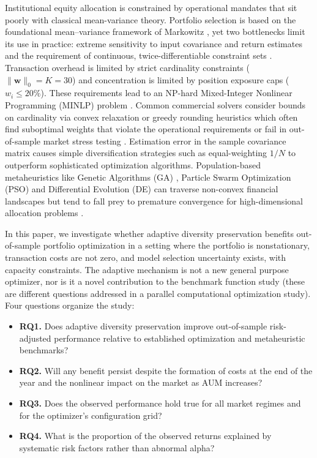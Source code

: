 \documentclass[11pt,a4paper]{article}
\begin{document}
Institutional equity allocation is constrained by operational mandates that sit poorly with classical mean-variance theory. Portfolio selection is based on the foundational mean--variance framework of Markowitz \cite{markowitz1952}, yet two bottlenecks limit its use in practice: extreme sensitivity to input covariance and return estimates \cite{olmo2023} and the requirement of continuous, twice-differentiable constraint sets \cite{li2024cardinality}. Transaction overhead is limited by strict cardinality constraints ($\|\mathbf{w}\|_0 = K = 30$) and concentration is limited by position exposure caps ($w_i \le 20\%$). These requirements lead to an NP-hard Mixed-Integer Nonlinear Programming (MINLP) problem \cite{li2024cardinality}. Common commercial solvers consider bounds on cardinality via convex relaxation or greedy rounding heuristics which often find suboptimal weights that violate the operational requirements or fail in out-of-sample market stress testing \cite{bertsimas1999, fabozzi2007}. Estimation error in the sample covariance matrix \cite{demiguel2009} causes simple diversification strategies such as equal-weighting $1/N$ to outperform sophisticated optimization algorithms. Population-based metaheuristics like Genetic Algorithms (GA) \cite{holland1992}, Particle Swarm Optimization (PSO) \cite{kennedy1995} and Differential Evolution (DE) \cite{storn1997} can traverse non-convex financial landscapes \cite{zheng2023} but tend to fall prey to premature convergence for high-dimensional allocation problems \cite{bailey2024}.

In this paper, we investigate whether adaptive diversity preservation benefits out-of-sample portfolio optimization in a setting where the portfolio is nonstationary, transaction costs are not zero, and model selection uncertainty exists, with capacity constraints. The adaptive mechanism is not a new general purpose optimizer, nor is it a novel contribution to the benchmark function study (these are different questions addressed in a parallel computational optimization study). Four questions organize the study:

\begin{itemize}
    \item \textbf{RQ1.} Does adaptive diversity preservation improve out-of-sample risk-adjusted performance relative to established optimization and metaheuristic benchmarks?
    \item \textbf{RQ2.} Will any benefit persist despite the formation of costs at the end of the year and the nonlinear impact on the market as AUM increases?
    \item \textbf{RQ3.} Does the observed performance hold true for all market regimes and for the optimizer's configuration grid?
    \item \textbf{RQ4.} What is the proportion of the observed returns explained by systematic risk factors rather than abnormal alpha?
\end{itemize}
\end{document}
